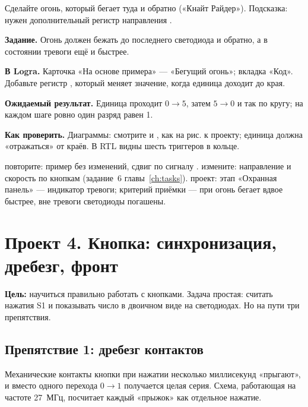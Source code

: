 \begin{taskbox}
Сделайте огонь, который бегает туда и обратно («Кнайт Райдер»). Подсказка:
нужен дополнительный регистр направления .
\end{taskbox}

\begin{diybox}
\textbf{Задание.} Огонь должен бежать до последнего светодиода и обратно, а в состоянии тревоги ещё и быстрее.

\textbf{В Logra.} Карточка «На основе примера» --- «Бегущий огонь»; вкладка «Код». Добавьте регистр , который меняет значение, когда единица доходит до края.

\textbf{Ожидаемый результат.} Единица проходит $0\to5$, затем $5\to0$ и так по кругу; на каждом шаге ровно один разряд равен 1.

\textbf{Как проверить.} Диаграммы: смотрите  и , как на рис. к проекту; единица должна «отражаться» от краёв. В RTL видны шесть триггеров в кольце.

 повторите: пример без изменений, сдвиг по сигналу .  измените: направление и скорость по кнопкам (задание~6 главы~\ref{ch:tasks}).  проект: этап «Охранная панель» --- индикатор тревоги; критерий приёмки --- при  огонь бегает вдвое быстрее, вне тревоги светодиоды погашены.
\end{diybox}

\section{Проект 4. Кнопка: синхронизация, дребезг, фронт}

\textbf{Цель:} научиться правильно работать с кнопками. Задача простая:
считать нажатия S1 и показывать число в двоичном виде на светодиодах. Но
на пути три препятствия.

\subsection{Препятствие 1: дребезг контактов}

Механические контакты кнопки при нажатии несколько миллисекунд «прыгают», и
вместо одного перехода $0\to1$ получается целая серия. Схема, работающая
на частоте 27~МГц, посчитает каждый «прыжок» как отдельное нажатие.

